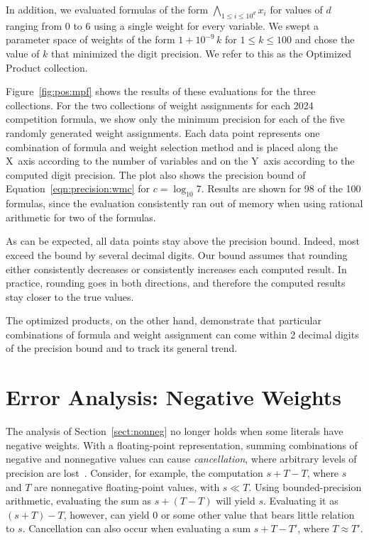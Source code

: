 \documentclass[letterpaper,USenglish,cleveref, autoref, thm-restate]{lipics-v2021}
\begin{document}
In addition, we evaluated formulas of the form $\bigwedge_{1\leq i
  \leq 10^d} x_i$ for values of $d$ ranging from $0$ to $6$ using a
single weight for every variable.  We swept a parameter space of
weights of the form $1 + 10^{-9}\,k$ for $1 \leq k \leq 100$ and
chose the value of $k$ that minimized the digit precision.  We refer
to this as the \textsf{Optimized Product} collection.

Figure~\ref{fig:pos:mpf} shows the results of these evaluations for
the three collections.  For the two collections of weight assignments for each 2024 competition formula,
we show only the minimum precision for each of the five randomly
generated  weight assignments.  Each data point
represents one combination of formula and weight selection method and is placed
along the X~axis according to the number of variables
and on the Y~axis according to the computed digit precision.
The plot also shows the precision bound of Equation~\ref{eqn:precision:wmc} for $c=\log_{10} 7$.
Results are shown for 98 of the 100 formulas, since the evaluation consistently ran out of memory when using rational arithmetic for two of the formulas.

As can
be expected, all data points stay above the precision bound.  Indeed,
most exceed the bound by several decimal digits.  Our bound assumes
that rounding either consistently decreases or consistently
increases each computed result.  In practice, rounding goes in both directions, and
therefore the computed results stay closer to the true values.

The optimized products, on the other hand, demonstrate that particular
combinations of formula and weight assignment can come within 2 decimal digits of the
precision bound and to track its general trend.

\section{Error Analysis: Negative Weights}
\label{sect:neg}

The analysis of Section~\ref{sect:nonneg} no longer holds when
some literals have negative weights.  With a floating-point
representation, summing combinations of negative and nonnegative
values can cause \emph{cancellation}, where arbitrary levels of
precision are lost~\cite{knuth:fp:1981}.  Consider, for example, the computation
$s + T - T$, where $s$ and $T$ are nonnegative floating-point values, with $s \ll T$.  Using
bounded-precision arithmetic, evaluating the sum as $s + (T - T)$ will yield $s$.
Evaluating it as $(s + T) - T$, however, can yield $0$ or some other value that bears little relation to $s$.
Cancellation can also occur when evaluating a sum $s + T - T'$, where $T \approx T'$.
\end{document}

